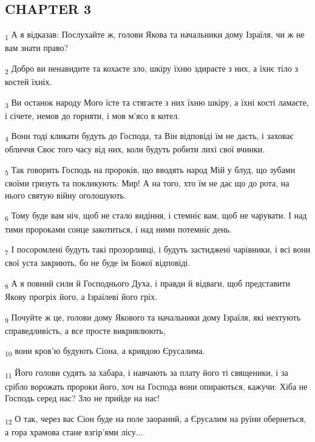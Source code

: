 \subsection{CHAPTER 3}
\begin{tcolorbox}
\textsubscript{1} А я відказав: Послухайте ж, голови Якова та начальники дому Ізраїля, чи ж не вам знати право?
\end{tcolorbox}
\begin{tcolorbox}
\textsubscript{2} Добро ви ненавидите та кохаєте зло, шкіру їхню здираєте з них, а їхнє тіло з костей їхніх.
\end{tcolorbox}
\begin{tcolorbox}
\textsubscript{3} Ви останок народу Мого їсте та стягаєте з них їхню шкіру, а їхні кості ламаєте, і січете, немов до горняти, і мов м'ясо в котел.
\end{tcolorbox}
\begin{tcolorbox}
\textsubscript{4} Вони тоді кликати будуть до Господа, та Він відповіді їм не дасть, і заховає обличчя Своє того часу від них, коли будуть робити лихі свої вчинки.
\end{tcolorbox}
\begin{tcolorbox}
\textsubscript{5} Так говорить Господь на пророків, що вводять народ Мій у блуд, що зубами своїми гризуть та покликують: Мир! А на того, хто їм не дає що до рота, на нього святую війну оголошують.
\end{tcolorbox}
\begin{tcolorbox}
\textsubscript{6} Тому буде вам ніч, щоб не стало видіння, і стемніє вам, щоб не чарувати. І над тими пророками сонце закотиться, і над ними потемніє день.
\end{tcolorbox}
\begin{tcolorbox}
\textsubscript{7} І посоромлені будуть такі прозорливці, і будуть застиджені чарівники, і всі вони свої уста закриють, бо не буде їм Божої відповіді.
\end{tcolorbox}
\begin{tcolorbox}
\textsubscript{8} А я повний сили й Господнього Духа, і правди й відваги, щоб представити Якову прогріх його, а Ізраїлеві його гріх.
\end{tcolorbox}
\begin{tcolorbox}
\textsubscript{9} Почуйте ж це, голови дому Якового та начальники дому Ізраїля, які нехтують справедливість, а все просте викривлюють,
\end{tcolorbox}
\begin{tcolorbox}
\textsubscript{10} вони кров'ю будують Сіона, а кривдою Єрусалима.
\end{tcolorbox}
\begin{tcolorbox}
\textsubscript{11} Його голови судять за хабара, і навчають за плату його ті священики, і за срібло ворожать пророки його, хоч на Господа вони опираються, кажучи: Хіба не Господь серед нас? Зло не прийде на нас!
\end{tcolorbox}
\begin{tcolorbox}
\textsubscript{12} О так, через вас Сіон буде на поле заораний, а Єрусалим на руїни обернеться, а гора храмова стане взгір'ями лісу...
\end{tcolorbox}
